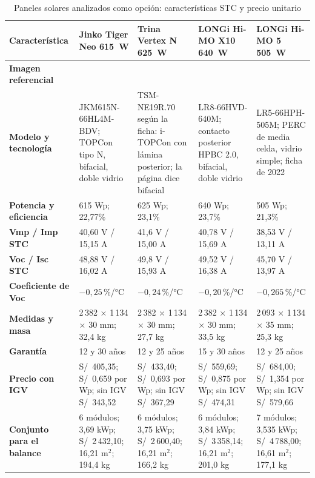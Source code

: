 \begin{table}[p]\formatofichas
\caption{Paneles solares analizados como opción: características STC y precio unitario}\label{tab:modulos_comparados}
\begin{tabularx}{\linewidth}{@{}>{\raggedright\arraybackslash}p{2.15cm}YYYY@{}}
\toprule
\textbf{Característica} & \textbf{Jinko Tiger Neo 615~W} & \textbf{Trina Vertex N 625~W} & \textbf{LONGi Hi-MO X10 640~W} & \textbf{LONGi Hi-MO 5 505~W}\\\midrule
\textbf{Imagen referencial} &  &  &  & \\
\textbf{Modelo y tecnología} & JKM615N-66HL4M-BDV; TOPCon tipo N, bifacial, doble vidrio & TSM-NE19R.70 según la ficha: i-TOPCon con lámina posterior; la página dice bifacial & LR8-66HVD-640M; contacto posterior HPBC 2.0, bifacial, doble vidrio & LR5-66HPH-505M; PERC de media celda, vidrio simple; ficha de 2022\\
\textbf{Potencia y eficiencia} & 615 Wp; 22,77\% & 625 Wp; 23,1\% & 640 Wp; 23,7\% & 505 Wp; 21,3\%\\
\textbf{Vmp / Imp STC} & 40,60 V / 15,15 A & 41,6 V / 15,00 A & 40,78 V / 15,69 A & 38,53 V / 13,11 A\\
\textbf{Voc / Isc STC} & 48,88 V / 16,02 A & 49,8 V / 15,93 A & 49,52 V / 16,38 A & 45,70 V / 13,97 A\\
\textbf{Coeficiente de Voc} & $-0{,}25$\,\%/°C & $-0{,}24$\,\%/°C & $-0{,}20$\,\%/°C & $-0{,}265$\,\%/°C\\
\textbf{Medidas y masa} & 2\,382 $\times$ 1\,134 $\times$ 30 mm; 32,4 kg & 2\,382 $\times$ 1\,134 $\times$ 30 mm; 27,7 kg & 2\,382 $\times$ 1\,134 $\times$ 30 mm; 33,5 kg & 2\,093 $\times$ 1\,134 $\times$ 35 mm; 25,3 kg\\
\textbf{Garantía} & 12 y 30 años & 12 y 25 años & 15 y 30 años & 12 y 25 años\\
\textbf{Precio con IGV} & S/~405,35; S/~0,659 por Wp; sin IGV S/~343,52 & S/~433,40; S/~0,693 por Wp; sin IGV S/~367,29 & S/~559,69; S/~0,875 por Wp; sin IGV S/~474,31 & S/~684,00; S/~1,354 por Wp; sin IGV S/~579,66\\
\textbf{Conjunto para el balance} & 6 módulos; 3,69 kWp; S/~2\,432,10; 16,21 m$^2$; 194,4 kg & 6 módulos; 3,75 kWp; S/~2\,600,40; 16,21 m$^2$; 166,2 kg & 6 módulos; 3,84 kWp; S/~3\,358,14; 16,21 m$^2$; 201,0 kg & 7 módulos; 3,535 kWp; S/~4\,788,00; 16,61 m$^2$; 177,1 kg\\

\end{tabularx}
\end{table}
